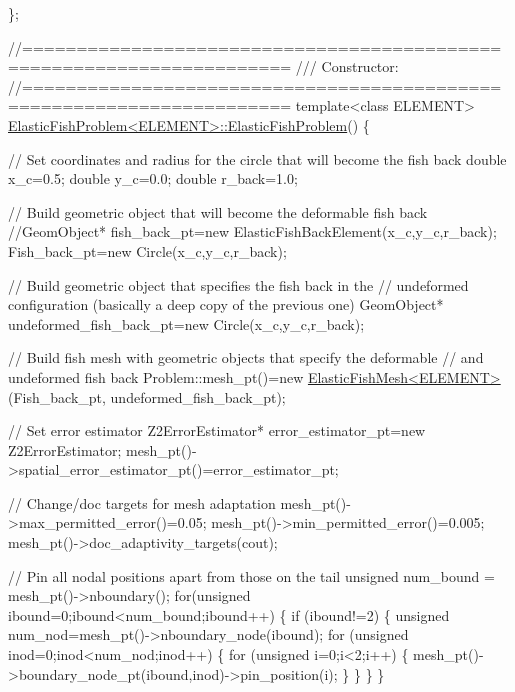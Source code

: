 \begin{DoxyCodeInclude}
\};

\textcolor{comment}{//====================================================================== }\textcolor{comment}{}
\textcolor{comment}{/// Constructor: }
\textcolor{comment}{}\textcolor{comment}{//====================================================================== }
\textcolor{keyword}{template}<\textcolor{keyword}{class} ELEMENT>
\hyperlink{classElasticFishProblem_adf9fdb0b94ac76b7fdb34bc7fa809a41}{ElasticFishProblem<ELEMENT>::ElasticFishProblem}() 
\{

 \textcolor{comment}{// Set coordinates and radius for the circle that will become the fish back}
 \textcolor{keywordtype}{double} x\_c=0.5;
 \textcolor{keywordtype}{double} y\_c=0.0;
 \textcolor{keywordtype}{double} r\_back=1.0;

 \textcolor{comment}{// Build geometric object that will become the deformable fish back}
 \textcolor{comment}{//GeomObject* fish\_back\_pt=new ElasticFishBackElement(x\_c,y\_c,r\_back);}
 Fish\_back\_pt=\textcolor{keyword}{new} Circle(x\_c,y\_c,r\_back);

 \textcolor{comment}{// Build geometric object that specifies the fish back in the}
 \textcolor{comment}{// undeformed configuration (basically a deep copy of the previous one)}
 GeomObject* undeformed\_fish\_back\_pt=\textcolor{keyword}{new} Circle(x\_c,y\_c,r\_back);

 \textcolor{comment}{// Build fish mesh with geometric objects that specify the deformable}
 \textcolor{comment}{// and undeformed fish back }
 Problem::mesh\_pt()=\textcolor{keyword}{new} \hyperlink{classElasticFishMesh}{ElasticFishMesh<ELEMENT>}(Fish\_back\_pt,
                                                 undeformed\_fish\_back\_pt);

 \textcolor{comment}{// Set error estimator}
 Z2ErrorEstimator* error\_estimator\_pt=\textcolor{keyword}{new} Z2ErrorEstimator;
 mesh\_pt()->spatial\_error\_estimator\_pt()=error\_estimator\_pt;
  
 \textcolor{comment}{// Change/doc targets for mesh adaptation}
 mesh\_pt()->max\_permitted\_error()=0.05;
 mesh\_pt()->min\_permitted\_error()=0.005;
 mesh\_pt()->doc\_adaptivity\_targets(cout);

 \textcolor{comment}{// Pin all nodal positions apart from those on the tail}
 \textcolor{keywordtype}{unsigned} num\_bound = mesh\_pt()->nboundary();
 \textcolor{keywordflow}{for}(\textcolor{keywordtype}{unsigned} ibound=0;ibound<num\_bound;ibound++)
  \{
   \textcolor{keywordflow}{if} (ibound!=2)
    \{
     \textcolor{keywordtype}{unsigned} num\_nod=mesh\_pt()->nboundary\_node(ibound);
     \textcolor{keywordflow}{for} (\textcolor{keywordtype}{unsigned} inod=0;inod<num\_nod;inod++)
      \{
       \textcolor{keywordflow}{for} (\textcolor{keywordtype}{unsigned} i=0;i<2;i++)
        \{
         mesh\_pt()->boundary\_node\_pt(ibound,inod)->pin\_position(i); 
        \}
      \}
    \}
  \}


\end{DoxyCodeInclude}
